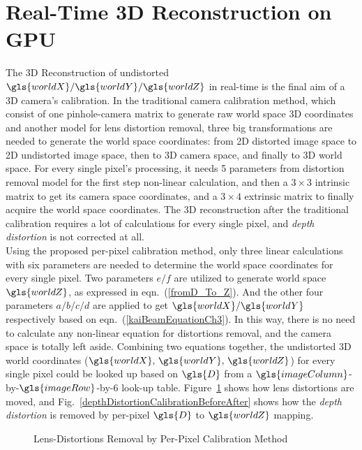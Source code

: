 \section{Real-Time \gls{3D} Reconstruction on \gls{GPU}}
%
The \gls{3D} Reconstruction of undistorted \(\gls{worldX}/\gls{worldY}/\gls{worldZ}\) in real-time is the final aim of a \gls{3D} camera's calibration. In the traditional camera calibration method, which consist of one pinhole-camera matrix to generate raw world space \gls{3D} coordinates and another model for lens distortion removal, three big transformations are needed to generate the world space coordinates: from 2D distorted image space to 2D undistorted image space, then to \gls{3D} camera space, and finally to \gls{3D} world space. For every single pixel's processing, it needs 5 parameters from distortion removal model for the first step non-linear calculation, and then a $3\times3$ intrinsic matrix to get its camera space coordinates, and a $3\times4$ extrinsic matrix to finally acquire the world space coordinates. The \gls{3D} reconstruction after the traditional calibration requires a lot of calculations for every single pixel, and \emph{depth distortion} is not corrected at all.
\\\indent
%
Using the proposed per-pixel calibration method, only three linear calculations with six parameters are needed to determine the world space coordinates for every single pixel. Two parameters \(e/f\) are utilized to generate world space \(\gls{worldZ}\), as expressed in eqn.~(\ref{fromD_To_Z}). And the other four parameters \(a/b/c/d\) are applied to get \(\gls{worldX}/\gls{worldY}\) respectively based on eqn.~(\ref{kaiBeamEquationCh3}). In this way, there is no need to calculate any non-linear equation for distortions removal, and the camera space is totally left aside. Combining two equations together, the undistorted \gls{3D} world coordinates (\(\gls{worldX}, \, \gls{worldY}, \, \gls{worldZ}\)) for every single pixel could be looked up based on \(\gls{D}\) from a \(\gls{imageColumn}\)-by-\(\gls{imageRow}\)-by-\(6\) look-up table. Figure~\ref{perPixelCalibrationBeforeAfter} shows how lens distortions are moved, and Fig.~\ref{depthDistortionCalibrationBeforeAfter} shows how the \emph{depth distortion} is removed by per-pixel \(\gls{D}\) to \(\gls{worldZ}\) mapping.
\begin{figure}[t]
\centering
\hspace*{-0.3cm}
%
%
\caption{Lens-Distortions Removal by Per-Pixel Calibration Method}
\label{perPixelCalibrationBeforeAfter}
\end{figure}%
